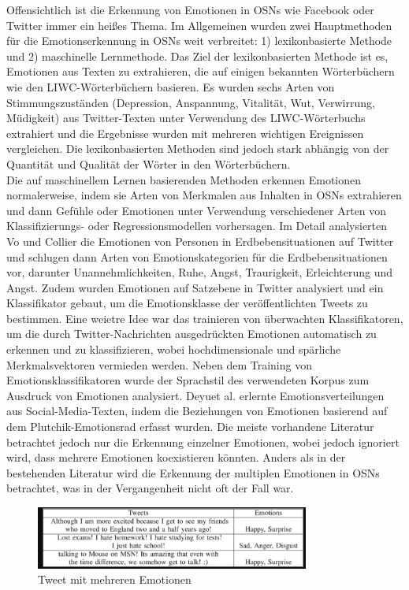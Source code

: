 \documentclass[conference]{IEEEtran}
\begin{document}
Offensichtlich ist die Erkennung von Emotionen in OSNs wie Facebook oder Twitter immer ein heißes Thema. Im Allgemeinen wurden zwei Hauptmethoden für die Emotionserkennung in OSNs weit verbreitet: 1) lexikonbasierte Methode und 2) maschinelle Lernmethode. Das Ziel der lexikonbasierten Methode ist es, Emotionen aus Texten zu extrahieren, die auf einigen bekannten
Wörterbüchern wie den LIWC-Wörterbüchern basieren. Es wurden sechs Arten von Stimmungszuständen (Depression, Anspannung, Vitalität, Wut, Verwirrung, Müdigkeit) aus Twitter-Texten unter Verwendung des LIWC-Wörterbuchs extrahiert und die Ergebnisse wurden mit mehreren wichtigen Ereignissen vergleichen. Die lexikonbasierten Methoden sind jedoch stark abhängig von der Quantität und Qualität der Wörter in den Wörterbüchern.\cite{b1}
\\ 
Die auf maschinellem Lernen basierenden Methoden erkennen Emotionen normalerweise, indem sie Arten von Merkmalen aus Inhalten in OSNs extrahieren und dann Gefühle oder Emotionen unter Verwendung verschiedener Arten von Klassifizierungs- oder Regressionsmodellen vorhersagen. Im Detail analysierten Vo und Collier die Emotionen von Personen in Erdbebensituationen auf Twitter und schlugen dann Arten von Emotionskategorien für die Erdbebensituationen vor, darunter Unannehmlichkeiten, Ruhe, Angst, Traurigkeit, Erleichterung und Angst. Zudem wurden Emotionen auf Satzebene in Twitter analysiert und ein Klassifikator gebaut, um die Emotionsklasse der veröffentlichten Tweets zu bestimmen. Eine weietre Idee war das trainieren von überwachten Klassifikatoren, um die durch Twitter-Nachrichten ausgedrückten Emotionen automatisch zu erkennen und zu klassifizieren, wobei hochdimensionale und spärliche Merkmalsvektoren vermieden werden. Neben dem Training von Emotionsklassifikatoren wurde der Sprachstil des verwendeten Korpus zum Ausdruck von Emotionen analysiert. Deyuet al. erlernte Emotionsverteilungen aus Social-Media-Texten, indem die Beziehungen von Emotionen basierend auf dem Plutchik-Emotionsrad erfasst wurden. Die meiste vorhandene Literatur betrachtet jedoch nur die Erkennung einzelner Emotionen, wobei jedoch ignoriert wird, dass mehrere
Emotionen koexistieren könnten. Anders als in der bestehenden Literatur wird  die Erkennung der multiplen Emotionen in OSNs betrachtet, was in der Vergangenheit nicht oft der Fall war.\cite{b1}
\begin{figure}[h]
	\centering
	\includegraphics[width=9cm]{Tweets}
	\caption{Tweet mit mehreren Emotionen}
\end{figure}
\end{document}

